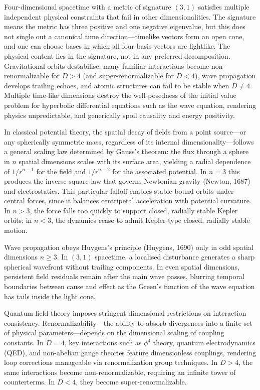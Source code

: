 Four-dimensional spacetime with a metric of signature $(3,1)$ satisfies multiple independent physical constraints that fail in other dimensionalities. The signature means the metric has three positive and one negative eigenvalue, but this does not single out a canonical \QSOpen{}time direction\QSClose{}—timelike vectors form an open cone, and one can choose bases in which all four basis vectors are lightlike. The physical content lies in the signature, not in any preferred decomposition. Gravitational orbits destabilise, many familiar interactions become non-renormalizable for $D>4$ (and super-renormalizable for $D<4$), wave propagation develops trailing echoes, and atomic structures can fail to be stable when $D \ne 4$. Multiple time-like dimensions destroy the well-posedness of the initial value problem for hyperbolic differential equations such as the wave equation, rendering physics unpredictable, and generically spoil causality and energy positivity.

In classical potential theory, the spatial decay of fields from a point source—or any spherically symmetric mass, regardless of its internal dimensionality—follows a general scaling law determined by Gauss’s theorem: the flux through a sphere in $n$ spatial dimensions scales with its surface area, yielding a radial dependence of $1/r^{n-1}$ for the field and $1/r^{n-2}$ for the associated potential. In $n=3$ this produces the inverse-square law that governs Newtonian gravity (Newton, 1687) and electrostatics. This particular falloff enables stable bound orbits under central forces, since it balances centripetal acceleration with potential curvature. In $n>3$, the force falls too quickly to support closed, radially stable Kepler orbits; in $n<3$, the dynamics cease to admit Kepler-type closed, radially stable motion.

Wave propagation obeys Huygens's principle (Huygens, 1690) only in odd spatial dimensions $n\ge 3$. In $(3,1)$ spacetime, a localised disturbance generates a sharp spherical wavefront without trailing components. In even spatial dimensions, persistent field residuals remain after the main wave passes, blurring temporal boundaries between cause and effect as the Green’s function of the wave equation has tails inside the light cone.

Quantum field theory imposes stringent dimensional restrictions on interaction consistency. Renormalizability—the ability to absorb divergences into a finite set of physical parameters—depends on the dimensional scaling of coupling constants. In $D=4$, key interactions such as $\phi^4$ theory, quantum electrodynamics (QED), and non-abelian gauge theories feature dimensionless couplings, rendering loop corrections manageable via renormalization group techniques. In $D>4$, the same interactions become non-renormalizable, requiring an infinite tower of counterterms. In $D<4$, they become super-renormalizable.

